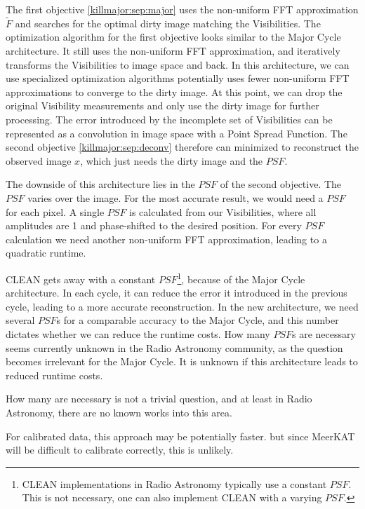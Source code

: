 The first objective \eqref{killmajor:sep:major} uses the non-uniform FFT approximation $\tilde{F}$ and searches for the optimal dirty image matching the Visibilities. The optimization algorithm for the first objective looks similar to the Major Cycle architecture. It still uses the non-uniform FFT approximation, and iteratively transforms the Visibilities to image space and back. In this architecture, we can use specialized optimization algorithms potentially uses fewer non-uniform FFT approximations to converge to the dirty image. At this point, we can drop the original Visibility measurements and only use the dirty image for further processing. The error introduced by the incomplete set of Visibilities can be represented as a convolution in image space with a Point Spread Function. The second objective \eqref{killmajor:sep:deconv} therefore can minimized to reconstruct the observed image $x$, which just needs the dirty image and the $PSF$.

The downside of this architecture lies in the $PSF$ of the second objective. The $PSF$ varies over the image. For the most accurate result, we would need a $PSF$ for each pixel. A single $PSF$ is calculated from our Visibilities, where all amplitudes are 1 and phase-shifted to the desired position. For every $PSF$ calculation we need another non-uniform FFT approximation, leading to a quadratic runtime.

CLEAN gets away with a constant $PSF$\footnote{CLEAN implementations in Radio Astronomy typically use a constant $PSF$. This is not necessary, one can also implement CLEAN with a varying $PSF$.}, because of the Major Cycle architecture. In each cycle, it can reduce the error it introduced in the previous cycle, leading to a more accurate reconstruction. In the new architecture, we need several $PSF$s for a comparable accuracy to the Major Cycle, and this number dictates whether we can reduce the runtime costs. How many $PSF$s are necessary seems currently unknown in the Radio Astronomy community, as the question becomes irrelevant for the Major Cycle. It is unknown if this architecture leads to reduced runtime costs.


How many are necessary is not a trivial question, and at least in Radio Astronomy, there are no known works into this area.




For calibrated data, this approach may be potentially faster. but since MeerKAT will be difficult to calibrate correctly, this is unlikely.

